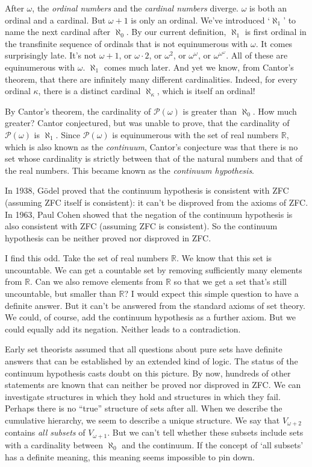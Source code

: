 After $\omega$,
the \emph{ordinal numbers} and the \emph{cardinal numbers} diverge.
$\omega$ is both an ordinal and a cardinal.
But $\omega\!+\!1$ is only an ordinal.
We've introduced `$\aleph_1$' to name the next cardinal after $\aleph_0$.
By our current definition,
$\aleph_1$ is first ordinal in the transfinite sequence of ordinals
that is not equinumerous with $\omega$.
It comes surprisingly late.
It's not $\omega\!+\!1$,
or $\omega \cdot 2$, or $\omega^{2}$, or $\omega^{\omega}$,
or $\omega^{\omega^{\omega}}$.
All of these are equinumerous with $\omega$.
$\aleph_{1}$ comes much later.
And yet we know,
from Cantor's theorem,
that there are infinitely many different cardinalities.
Indeed,
for every ordinal $\kappa$,
there is a distinct cardinal $\aleph_{\kappa}$,
which is itself an ordinal!

By Cantor's theorem,
the cardinality of $\mathcal{P}(\omega)$ is greater than $\aleph_0$.
How much greater?
Cantor conjectured, but was unable to prove, that
the cardinality of $\mathcal{P}(\omega)$ is $\aleph_1$.
Since $\mathcal{P}(\omega)$ is equinumerous with the set of real numbers $\mathbb{R}$,
which is also known as the \emph{continuum},
Cantor's conjecture was that
there is no set whose cardinality is strictly between that of the natural numbers
and that of the real numbers.
This became known as the \emph{continuum hypothesis}.

In 1938,
Gödel proved that the continuum hypothesis is consistent with ZFC
(assuming ZFC itself is consistent):
it can't be disproved from the axioms of ZFC.
In 1963,
Paul Cohen showed that the negation of the continuum hypothesis is also consistent with ZFC
(assuming ZFC is consistent).
So the continuum hypothesis can be neither proved nor disproved in ZFC.

I find this odd.
Take the set of real numbers $\mathbb{R}$.
We know that this set is uncountable.
We can get a countable set by
removing sufficiently many elements from $\mathbb{R}$.
Can we also remove elements from $\mathbb{R}$
so that we get a set that's still uncountable, but smaller than $\mathbb{R}$?
I would expect this simple question to have a definite answer.
But it can't be answered from the standard axioms of set theory.
We could, of course, add the continuum hypothesis as a further axiom.
But we could equally add its negation.
Neither leads to a contradiction.

Early set theorists assumed that
all questions about pure sets have definite answers that
can be established by an extended kind of logic.
The status of the continuum hypothesis casts doubt on this picture.
By now,
hundreds of other statements are known that
can neither be proved nor disproved in ZFC.
We can investigate structures in which they hold
and structures in which they fail.
Perhaps there is no ``true'' structure of sets after all.
When we describe the cumulative hierarchy,
we seem to describe a unique structure.
We say that $V_{\omega+2}$ contains \textit{all subsets} of $V_{\omega+1}$.
But we can't tell whether
these subsets include sets with a cardinality between $\aleph_0$ and the continuum.
If the concept of `all subsets' has a definite meaning,
this meaning seems impossible to pin down.

